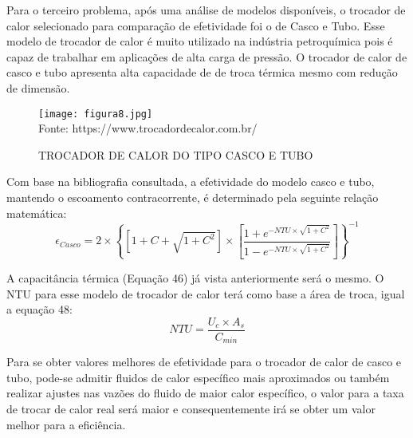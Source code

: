 \documentclass[a4paper,12pt,oneside]{article}
\begin{document}
\begin{flushright}
Para o terceiro problema, após uma análise de modelos disponíveis, o trocador de calor selecionado para comparação de efetividade foi o de Casco e Tubo. Esse modelo de trocador de calor é muito utilizado na indústria petroquímica pois é capaz de trabalhar em aplicações de alta carga de pressão. O trocador de calor de casco e tubo apresenta alta capacidade de de troca térmica mesmo com redução de dimensão.
\pagebreak
\clearpage
\newpage

\begin{figure}[h]
	\centering
	\caption{TROCADOR DE CALOR DO TIPO CASCO E TUBO}
	\vspace{0.5cm}
	\texttt{[image: figura8.jpg]}
	\vspace{0.5cm}\\
	Fonte: https://www.trocadordecalor.com.br/
\end{figure}
\vspace{0.5cm}

Com base na bibliografia consultada, a efetividade do modelo casco e tubo, mantendo o escoamento contracorrente, é determinado pela seguinte relação matemática:\\

\begin{equation}\label{eq50}
	\epsilon_{Casco} = 2 \times \left\{  \left[ 1 +  C + \sqrt{1 + C^2}    \right] \times \left[ \frac{1 + e^{-NTU \times \sqrt{1 + C^2}}}{1 - e^{-NTU \times \sqrt{1 + C^2}}}\right] \right\}^{-1}
\end{equation}
\vspace{0.5cm}

A capacitância térmica (Equação 46) já vista anteriormente será o mesmo. O NTU para esse modelo de trocador de calor terá como base a área de troca, igual a equação 48:\\

\begin{equation}\label{eq51}
NTU = \frac{U_{c} \times A_{s}}{C_{min}}
\end{equation}
\vspace{0.5cm}

Para se obter valores melhores de efetividade para o trocador de calor de casco e tubo, pode-se admitir fluidos de calor específico mais aproximados ou também realizar ajustes nas vazões do fluido de maior calor específico, o valor para a taxa de trocar de calor real será maior e consequentemente irá se obter um valor melhor para a eficiência.\\


\end{flushright}
\end{document}
